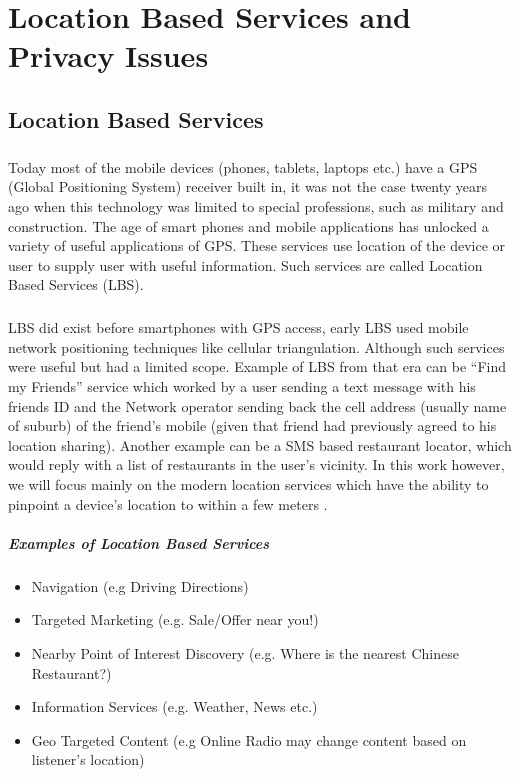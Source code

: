 \documentclass[12pt]{report}
\theoremstyle{named}
\begin{document}
\chapter{Location Based Services and Privacy Issues}
\label{chap:LocationBasedServices}
\section{Location Based Services}
\paragraph{}
Today most of the mobile devices (phones, tablets, laptops etc.) have a GPS (Global Positioning System) receiver built in, it was not the case twenty years ago when this technology was limited to special professions, such as military and construction. The age of smart phones and mobile applications has unlocked a variety of useful applications of GPS. These services use location of the device or user to supply user with useful information. Such services are called Location Based Services (LBS).
\paragraph{}
LBS did exist before smartphones with GPS access, early LBS \cite{lbsShu} used mobile network positioning techniques like cellular triangulation. Although such services were useful but had a limited scope. Example of LBS from that era can be “Find my Friends” service which worked by a user sending a text message with his friends ID and the Network operator sending back the cell address (usually name of suburb) of the friend’s mobile (given that friend had previously agreed to his location sharing). Another example can be a SMS based restaurant locator, which would reply with a list of restaurants in the user’s vicinity. In this work however, we will focus mainly on the modern location services which have the ability to pinpoint a device's location to within a few meters \cite{ TGIS:TGIS1152}.
\paragraph{Examples of Location Based Services}
\begin{itemize}
\item Navigation (e.g Driving Directions)
\item Targeted Marketing (e.g. Sale/Offer near you!)
\item Nearby Point of Interest Discovery (e.g. Where is the nearest Chinese Restaurant?)
\item Information Services (e.g. Weather, News etc.)
\item Geo Targeted Content (e.g Online Radio may change content based on listener's location)
\end{itemize}
\end{document}
